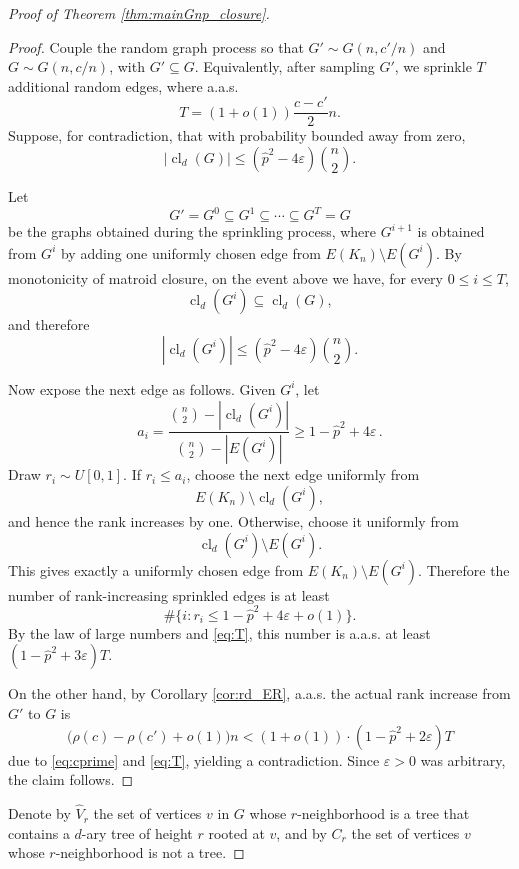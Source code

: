 \documentclass[reqno,english]{amsart}
\numberwithin{equation}{section}
\theoremstyle{definition}{
\newtheorem{example}[theorem]{Example}
\newtheorem{definition}[theorem]{Definition}
\newtheorem*{definition*}{Definition}
\newtheorem{problem}[theorem]{Problem}
\newtheorem{question}[theorem]{Question}
}
\begin{document}
\begin{proof}[Proof of Theorem \ref{thm:mainGnp_closure}]
\begin{proof}
Couple the random graph process so that \(G'\sim G(n,c'/n)\) and
\(G\sim G(n,c/n)\), with \(G'\subseteq G\). Equivalently, after
sampling \(G'\), we sprinkle \(T\) additional random edges, where a.a.s.
\begin{equation}\label{eq:T}
    T=(1+o(1))\frac{c-c'}{2}n.    
\end{equation}
Suppose, for contradiction, that with probability bounded away from zero,
\[
    |\operatorname{cl}_d(G)|
    \le
    \left(\hat p^2-4\varepsilon\right)\binom n2 .
\]

Let
\[
    G'=G^0\subseteq G^1\subseteq\cdots\subseteq G^T=G
\]
be the graphs obtained during the sprinkling process, where \(G^{i+1}\)
is obtained from \(G^i\) by adding one uniformly chosen edge from
\(E(K_n)\setminus E(G^i)\). By monotonicity of matroid closure, on the
event above we have, for every \(0\le i\le T\),
\[
    \operatorname{cl}_d(G^i)\subseteq \operatorname{cl}_d(G),
\]
and therefore
\[
    |\operatorname{cl}_d(G^i)|
    \le
    \left(\hat p^2-4\varepsilon\right)\binom n2 .
\]

Now expose the next edge as follows. Given \(G^i\), let
\[
    a_i
    =
    \frac{\binom n2-|\operatorname{cl}_d(G^i)|}
         {\binom n2-|E(G^i)|} 
         \ge 1-\hat p^2+4\varepsilon\,.
\]
Draw \(r_i\sim U[0,1]\). If \(r_i\le a_i\), choose the next edge uniformly
from
\[
    E(K_n)\setminus \operatorname{cl}_d(G^i),
\]
and hence the rank increases by one. Otherwise, choose it uniformly from
\[
    \operatorname{cl}_d(G^i)\setminus E(G^i).
\]
This gives exactly a uniformly chosen edge from
\(E(K_n)\setminus E(G^i)\). 
Therefore the number of rank-increasing sprinkled edges is at least
\[
    \#\{i:r_i\le 1-\hat p^2+4\varepsilon+o(1)\}.
\]
By the law of large numbers and \eqref{eq:T}, this number is a.a.s. at least
    $(1-\hat p^2+3\varepsilon)T.$
    
On the other hand, by Corollary \ref{cor:rd_ER}, a.a.s. the actual rank
increase from \(G'\) to \(G\) is
\[
    \big(\rho(c)-\rho(c')+o(1)\big)n <(1+o(1))\cdot( 1-\hat p^2+2\varepsilon)T
\]
due to \eqref{eq:cprime} and \eqref{eq:T},
yielding a contradiction. Since \(\varepsilon>0\) was arbitrary, the claim follows.
\end{proof}

Denote by $\widehat V_r$ the set of vertices $v$ in $G$ whose $r$-neighborhood is a tree that contains a $d$-ary tree of height $r$ rooted at $v$, and by $C_r$ the set of vertices $v$ whose $r$-neighborhood is not a tree.




\end{proof}
\end{document}
